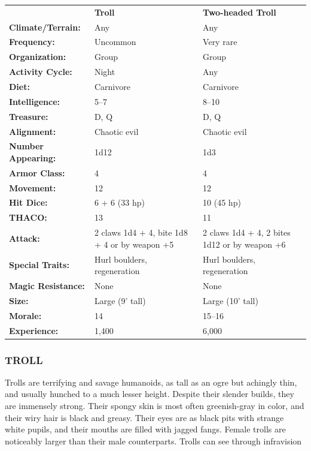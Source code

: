 \begin{multicols}{2}
\begin{minipage}{\columnwidth}
\noindent \begin{tabular}{p{}g{.24\columnwidth}p{.24\columnwidth}}
	& \textbf{Troll}	& \textbf{Two-headed Troll}	\\
\textbf{Climate/Terrain:}	& Any	& Any	\\
\textbf{Frequency:} 		& Uncommon	& Very rare	\\
\textbf{Organization:} 		& Group	& Group	\\
\textbf{Activity Cycle:} 	& Night	& Any	\\
\textbf{Diet:} 				& Carnivore	& Carnivore	\\
\textbf{Intelligence:} 		& 5--7	& 8--10	\\
\textbf{Treasure:} 			& D, Q	& D, Q	\\
\textbf{Alignment:} 		& Chaotic evil	& Chaotic evil	\\
\hline
\textbf{Number Appearing:} 	& 1d12	& 1d3	\\
\textbf{Armor Class:} 		& 4	& 4	\\
\textbf{Movement:} 			& 12	& 12	\\
\textbf{Hit Dice:} 			& 6 + 6 (33 hp)	& 10 (45 hp)	\\
\textbf{THACO:} 			& 13	& 11	\\
\textbf{Attack:} 			& 2 claws 1d4 + 4, bite 1d8 + 4	or by weapon +5	& 2 claws 1d4 + 4, 2 bites 1d12	or by weapon +6\\
\textbf{Special Traits:} & Hurl boulders, regeneration	& Hurl boulders, regeneration	\\
\textbf{Magic Resistance:} 	& None	& None	\\
\textbf{Size:} 				& Large (9' tall)	& Large (10' tall)	\\
\textbf{Morale:} 			& 14	& 15--16	\\
\textbf{Experience:} 		& 1,400	& 6,000	\\ %
\end{tabular}

\end{minipage}

\subsubsection{TROLL}

Trolls are terrifying and savage humanoids, as tall as an ogre but achingly thin, and usually hunched to a much lesser height. Despite their slender builds, they are immensely strong. Their spongy skin is most often greenish-gray in color, and their wiry hair is black and greasy. Their eyes are as black pits with strange white pupils, and their mouths are filled with jagged fangs. Female trolls are noticeably larger than their male counterparts. Trolls can see through infravision 


\end{multicols}
